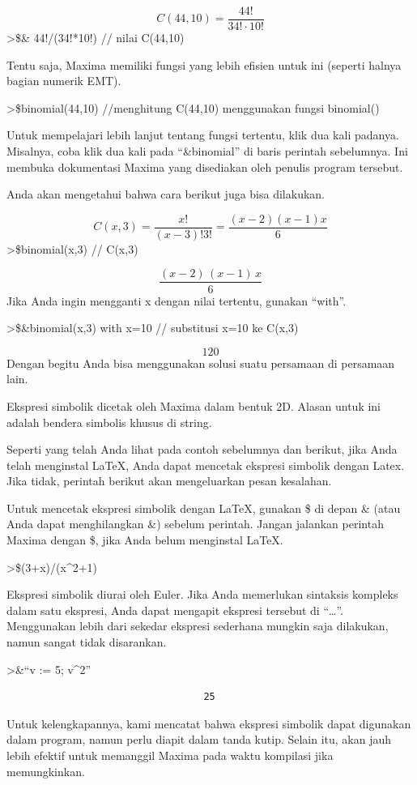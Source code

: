 \documentclass[
]{book}
\begin{document}
\[C(44,10) = \frac{44!}{34! \cdot 10!}\]\textgreater\$\& 44!/(34!*10!) // nilai C(44,10)

Tentu saja, Maxima memiliki fungsi yang lebih efisien untuk ini (seperti halnya bagian numerik EMT).

\textgreater\$binomial(44,10) //menghitung C(44,10) menggunakan fungsi binomial()

Untuk mempelajari lebih lanjut tentang fungsi tertentu, klik dua kali padanya. Misalnya, coba klik dua kali pada ``\&binomial'' di baris perintah sebelumnya. Ini membuka dokumentasi Maxima yang disediakan oleh penulis program tersebut.

Anda akan mengetahui bahwa cara berikut juga bisa dilakukan.

\[C(x,3)=\frac{x!}{(x-3)!3!}=\frac{(x-2)(x-1)x}{6}\]\textgreater\$binomial(x,3) // C(x,3)

\[\frac{\left(x-2\right)\,\left(x-1\right)\,x}{6}\]Jika Anda ingin mengganti x dengan nilai tertentu, gunakan ``with''.

\textgreater\$\&binomial(x,3) with x=10 // substitusi x=10 ke C(x,3)

\[120\]Dengan begitu Anda bisa menggunakan solusi suatu persamaan di persamaan lain.

Ekspresi simbolik dicetak oleh Maxima dalam bentuk 2D. Alasan untuk ini adalah bendera simbolis khusus di string.

Seperti yang telah Anda lihat pada contoh sebelumnya dan berikut, jika Anda telah menginstal LaTeX, Anda dapat mencetak ekspresi simbolik dengan Latex. Jika tidak, perintah berikut akan mengeluarkan pesan kesalahan.

Untuk mencetak ekspresi simbolik dengan LaTeX, gunakan \$ di depan \& (atau Anda dapat menghilangkan \&) sebelum perintah. Jangan jalankan perintah Maxima dengan \$, jika Anda belum menginstal LaTeX.

\textgreater\$(3+x)/(x\^{}2+1)

Ekspresi simbolik diurai oleh Euler. Jika Anda memerlukan sintaksis kompleks dalam satu ekspresi, Anda dapat mengapit ekspresi tersebut di ``\ldots{}''. Menggunakan lebih dari sekedar ekspresi sederhana mungkin saja dilakukan, namun sangat tidak disarankan.

\textgreater\&``v := 5; v\^{}2''

\begin{verbatim}
                                  25
\end{verbatim}

Untuk kelengkapannya, kami mencatat bahwa ekspresi simbolik dapat digunakan dalam program, namun perlu diapit dalam tanda kutip. Selain itu, akan jauh lebih efektif untuk memanggil Maxima pada waktu kompilasi jika memungkinkan.
\end{document}
